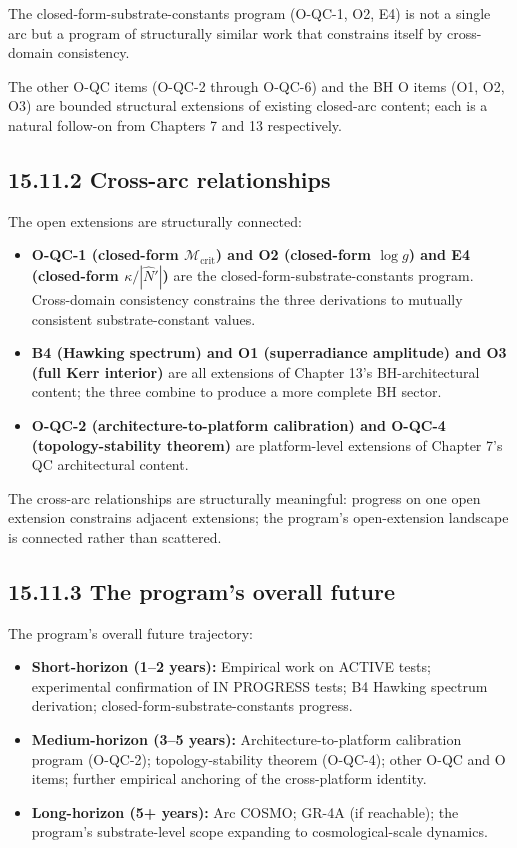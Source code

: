 \documentclass[11pt]{book}
\begin{document}
The closed-form-substrate-constants program (O-QC-1, O2, E4) is not a single arc but a program of structurally similar work that constrains itself by cross-domain consistency.

The other O-QC items (O-QC-2 through O-QC-6) and the BH O items (O1, O2, O3) are bounded structural extensions of existing closed-arc content; each is a natural follow-on from Chapters 7 and 13 respectively.

\subsection{15.11.2 Cross-arc relationships}

The open extensions are structurally connected:

\begin{itemize}
\item \textbf{O-QC-1 (closed-form $\mathcal{M}_\mathrm{crit}$) and O2 (closed-form $\log g$) and E4 (closed-form $\kappa/|\hat{N}'|$)} are the closed-form-substrate-constants program. Cross-domain consistency constrains the three derivations to mutually consistent substrate-constant values.
\item \textbf{B4 (Hawking spectrum) and O1 (superradiance amplitude) and O3 (full Kerr interior)} are all extensions of Chapter 13's BH-architectural content; the three combine to produce a more complete BH sector.
\item \textbf{O-QC-2 (architecture-to-platform calibration) and O-QC-4 (topology-stability theorem)} are platform-level extensions of Chapter 7's QC architectural content.
\end{itemize}

The cross-arc relationships are structurally meaningful: progress on one open extension constrains adjacent extensions; the program's open-extension landscape is connected rather than scattered.

\subsection{15.11.3 The program's overall future}

The program's overall future trajectory:

\begin{itemize}
\item \textbf{Short-horizon (1–2 years):} Empirical work on ACTIVE tests; experimental confirmation of IN PROGRESS tests; B4 Hawking spectrum derivation; closed-form-substrate-constants progress.
\item \textbf{Medium-horizon (3–5 years):} Architecture-to-platform calibration program (O-QC-2); topology-stability theorem (O-QC-4); other O-QC and O items; further empirical anchoring of the cross-platform identity.
\item \textbf{Long-horizon (5+ years):} Arc COSMO; GR-4A (if reachable); the program's substrate-level scope expanding to cosmological-scale dynamics.
\end{itemize}
\end{document}
